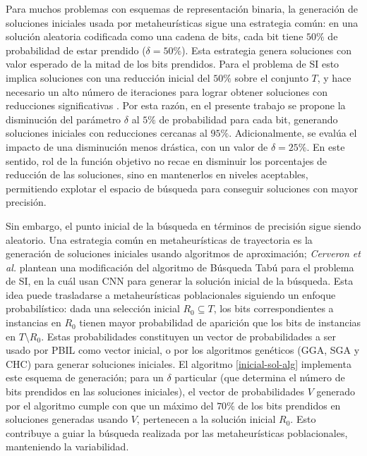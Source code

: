 Para muchos problemas con esquemas de representación binaria, la generación de soluciones iniciales usada por metaheurísticas sigue una estrategia común: en una solución aleatoria codificada como una cadena de bits, cada bit tiene $50\%$ de probabilidad de estar prendido ($\delta = 50\%$). Esta estrategia genera soluciones con valor esperado de la mitad de los bits prendidos. Para el problema de SI esto implica soluciones con una reducción inicial del $50\%$ sobre el conjunto $T$, y hace necesario un alto número de iteraciones para lograr obtener soluciones con reducciones significativas \cite{cano2003using}. Por esta razón, en el presente trabajo se propone la disminución del parámetro $\delta$ al $5\%$ de probabilidad para cada bit, generando soluciones iniciales con reducciones cercanas al $95\%$. Adicionalmente, se evalúa el impacto de una disminución menos drástica, con un valor de $\delta = 25\%$. En este sentido, rol de la función objetivo no recae en disminuir los porcentajes de reducción de las soluciones, sino en mantenerlos en niveles aceptables, permitiendo explotar el espacio de búsqueda para conseguir soluciones con mayor precisión.

Sin embargo, el punto inicial de la búsqueda en términos de precisión sigue siendo aleatorio. Una estrategia común en metaheurísticas de trayectoria es la generación de soluciones iniciales usando algoritmos de aproximación; \emph{Cerveron et al.} \cite{cerveron2001another} plantean una modificación del algoritmo de Búsqueda Tabú para el problema de SI, en la cuál usan CNN para generar la solución inicial de la búsqueda. Esta idea puede trasladarse a metaheurísticas poblacionales siguiendo un enfoque probabilístico: dada una selección inicial $R_0 \subseteq T$, los bits correspondientes a instancias en $R_0$ tienen mayor probabilidad de aparición que los bits de instancias en $T \setminus R_0$. Estas probabilidades constituyen un vector de probabilidades a ser usado por PBIL como vector inicial, o por los algoritmos genéticos (GGA, SGA y CHC) para generar soluciones iniciales. El algoritmo \ref{inicial-sol-alg} implementa este esquema de generación; para un $\delta$ particular (que determina el número de bits prendidos en las soluciones iniciales), el vector de probabilidades $V$ generado por el algoritmo cumple con que un máximo del $70\%$ de los bits prendidos en soluciones generadas usando $V$, pertenecen a la solución inicial $R_0$. Esto contribuye a guiar la búsqueda realizada por las metaheurísticas poblacionales, manteniendo la variabilidad.

